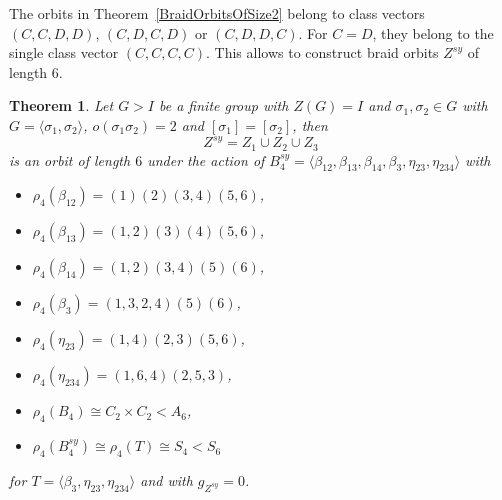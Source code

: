 \documentclass[12pt,a4paper]{article}
\newtheorem{theorem}{Theorem}[section]
\numberwithin{equation}{section}
\numberwithin{table}{section}
\begin{document}
The orbits in Theorem~\ref{BraidOrbitsOfSize2} belong to class vectors $(C,C,D,D)$, $(C,D,C,D)$
or $(C,D,D,C)$. For $C=D$, they belong to the single class vector $(C,C,C,C)$. This allows to
construct braid orbits $Z^{sy}$ of length $6$.
%
\begin{theorem}
\label{BraidOrbitsOfSize6}
Let $G>I$ be a finite group with $Z(G)=I$ and $\sigma_1, \sigma_2 \in G$ with
$G=\langle \sigma_1, \sigma_2 \rangle$, $o(\sigma_1 \sigma_2)=2$ and $[\sigma_1]=[\sigma_2]$, then
$$Z^{sy} = Z_1 \cup Z_2 \cup Z_3$$
is an orbit of length $6$ under the action of 
$B^{sy}_4 = \langle \beta_{12}, \beta_{13}, \beta_{14}, \beta_3, \eta_{23}, \eta_{234} \rangle$ with
\begin{itemize}
\item[]
$\rho_4(\beta_{12})=(1)(2)(3,4)(5,6)$,
\item[]
$\rho_4(\beta_{13})=(1,2)(3)(4)(5,6)$,
\item[]
$\rho_4(\beta_{14})=(1,2)(3,4)(5)(6)$,
\item[]
$\rho_4(\beta_3)=(1,3,2,4)(5)(6)$,
\item[]
$\rho_4(\eta_{23})=(1,4)(2,3)(5,6)$,
\item[]
$\rho_4(\eta_{234})=(1,6,4)(2,5,3)$,
\item[]
$\rho_4(B_4) \cong C_2 \times C_2 < A_6$,
\item[]
$\rho_4(B^{sy}_4) \cong \rho_4(T) \cong S_4 < S_6$
\end{itemize}
for $T=\langle \beta_3, \eta_{23}, \eta_{234} \rangle$ and with $g_{Z^{sy}} = 0$.
\end{theorem}
\end{document}
